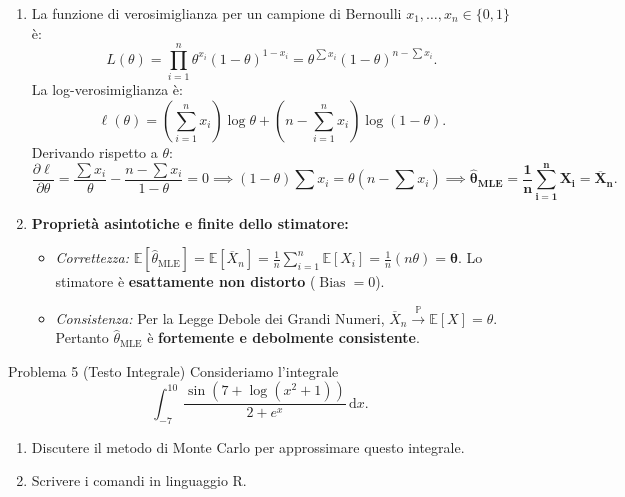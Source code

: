 \documentclass[11pt,a4paper]{article}
\newcommand{\EE}{\mathbb{E}}
\newcommand{\Prob}{\mathbb{P}}
\newcommand{\dx}{\mathrm{d}x}
\begin{document}
\begin{soluzionebox}
\begin{enumerate}[label=(\alph*)]
    \item La funzione di verosimiglianza per un campione di Bernoulli $x_1, \dots, x_n \in \{0, 1\}$ è:
    \[
    L(\theta) = \prod_{i=1}^n \theta^{x_i}(1-\theta)^{1-x_i} = \theta^{\sum x_i} (1-\theta)^{n - \sum x_i}.
    \]
    La log-verosimiglianza è:
    \[
    \ell(\theta) = \left(\sum_{i=1}^n x_i\right) \log \theta + \left(n - \sum_{i=1}^n x_i\right) \log(1-\theta).
    \]
    Derivando rispetto a $\theta$:
    \[
    \frac{\partial \ell}{\partial \theta} = \frac{\sum x_i}{\theta} - \frac{n - \sum x_i}{1-\theta} = 0 \implies (1-\theta)\sum x_i = \theta\left(n - \sum x_i\right) \implies \mathbf{\widehat{\theta}_{\text{MLE}} = \frac{1}{n}\sum_{i=1}^n X_i = \overline{X}_n}.
    \]

    \item \textbf{Proprietà asintotiche e finite dello stimatore:}
    \begin{itemize}
        \item \emph{Correttezza:} $\EE[\widehat{\theta}_{\text{MLE}}] = \EE[\overline{X}_n] = \frac{1}{n}\sum_{i=1}^n \EE[X_i] = \frac{1}{n}(n\theta) = \mathbf{\theta}$. Lo stimatore è \textbf{esattamente non distorto} ($\operatorname{Bias} = 0$).
        \item \emph{Consistenza:} Per la Legge Debole dei Grandi Numeri, $\overline{X}_n \xrightarrow{\Prob} \EE[X] = \theta$. Pertanto $\widehat{\theta}_{\text{MLE}}$ è \textbf{fortemente e debolmente consistente}.
    \end{itemize}
\end{enumerate}
\end{soluzionebox}

\begin{problemabox}{Problema 5 (Testo Integrale)}
Consideriamo l'integrale
\[
\int_{-7}^{10} \frac{\sin(7 + \log(x^2 + 1))}{2 + e^x} \, \dx.
\]
\begin{enumerate}[label=(\alph*)]
    \item Discutere il metodo di Monte Carlo per approssimare questo integrale.
    \item Scrivere i comandi in linguaggio R.
\end{enumerate}
\end{problemabox}
\end{document}

